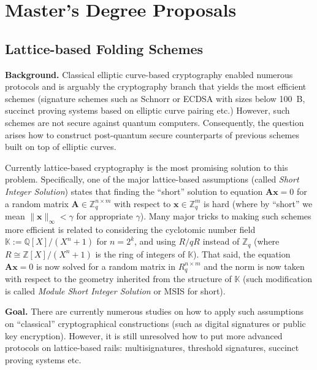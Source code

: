\documentclass{template}
\begin{document}
\section*{Master's Degree Proposals}

\subsection*{Lattice-based Folding Schemes}

\textbf{Background.} Classical elliptic curve-based cryptography enabled
numerous protocols and is arguably the cryptography branch that yields the most
efficient schemes (signature schemes such as Schnorr or ECDSA with sizes below
100~B, succinct proving systems based on elliptic curve pairing etc.) However,
such schemes are not secure against quantum computers. Consequently, the
question arises how to construct post-quantum secure counterparts of previous
schemes built on top of elliptic curves.

Currently lattice-based cryptography is the most promising solution to this
problem. Specifically, one of the major lattice-based assumptions (called
\textit{Short Integer Solution}) states that finding the ``short'' solution to
equation $\mathbf{Ax}=0$ for a random matrix $\mathbf{A} \in \mathbb{Z}_q^{n
\times m}$ with respect to $\mathbf{x} \in \mathbb{Z}_q^m$ is hard (where by
``short'' we mean $\|\mathbf{x}\|_{\infty}<\gamma$ for appropriate $\gamma$).
Many major tricks to making such schemes more efficient is related to
considering the cyclotomic number field $\mathbb{K} := \mathbb{Q}[X]/(X^n+1)$
for $n=2^k$, and using $R/qR$ instead of $\mathbb{Z}_q$
(where $R \cong \mathbb{Z}[X]/(X^n+1)$ is the ring of integers of
$\mathbb{K}$). That said, the equation $\mathbf{Ax}=0$ is now solved for a
random matrix in $R_q^{n \times m}$ and the norm is now taken with
respect to the geometry inherited from the structure of $\mathbb{K}$
(such modification is called \textit{Module Short Integer Solution} or MSIS for short).

\textbf{Goal.} There are currently numerous studies on how to apply such
assumptions on ``classical'' cryptographical constructions (such as digital
signatures or public key encryption). However, it is still unresolved how to put
more advanced protocols on lattice-based rails: multisignatures, threshold
signatures, succinct proving systems etc.
\end{document}
